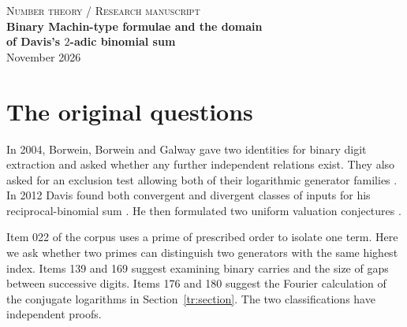 \documentclass[11pt]{article}
\begin{document}
\begin{center}
{\small\color{ink}\textsc{Number theory \enspace / \enspace Research manuscript}}\\[10pt]
{\LARGE\bfseries Binary Machin-type formulae and the domain\\[3pt] of Davis's $2$-adic binomial sum}\\[8pt]
{\small November 2026}
\end{center}
\begin{abstract}
We answer two questions of Borwein, Borwein and Galway about binary Machin-type formulae. The zero relations among their minimal arctangent generators form a two-dimensional space. Membership in their logarithmic family is decidable for every positive algebraic argument, with the Aurifeuillian generators included. The proof uses separate primitive divisors of the two factors of $2^{2k}+1$ at each large odd level. We also determine the domain of Davis's sum of reciprocal binomial coefficients along canonical dyadic truncations. If $-1-x$ has infinitely many set bits at positions $d_i$ and $R_i$ is its prefix through $d_i$, convergence is equivalent to $R_i-d_{i+1}\to+\infty$. Isolating one term in the difference between successive truncations proves necessity. We establish both of Davis's finite valuation conjectures with all equality cases. At every nonintegral rational argument in $\mathbb Z_2$ the limit is transcendental. Its linear relations at rational arguments are determined by their classes modulo $\mathbb Z$.
\end{abstract}
\tableofcontents
\section*{The original questions}
In 2004, Borwein, Borwein and Galway gave two identities for binary digit extraction and asked whether any further independent relations exist. They also asked for an exclusion test allowing both of their logarithmic generator families \cite[Appendix D, Problems 2 and 8]{BBG}. In 2012 Davis found both convergent and divergent classes of inputs for his reciprocal-binomial sum \cite{Davis12}. He then formulated two uniform valuation conjectures \cite{Davis14}.

Item 022 of the corpus \cite{Corpus} uses a prime of prescribed order to isolate one term. Here we ask whether two primes can distinguish two generators with the same highest index. Items 139 and 169 suggest examining binary carries and the size of gaps between successive digits. Items 176 and 180 suggest the Fourier calculation of the conjugate logarithms in Section~\ref{tr:section}. The two classifications have independent proofs.
\clearpage
\end{document}
